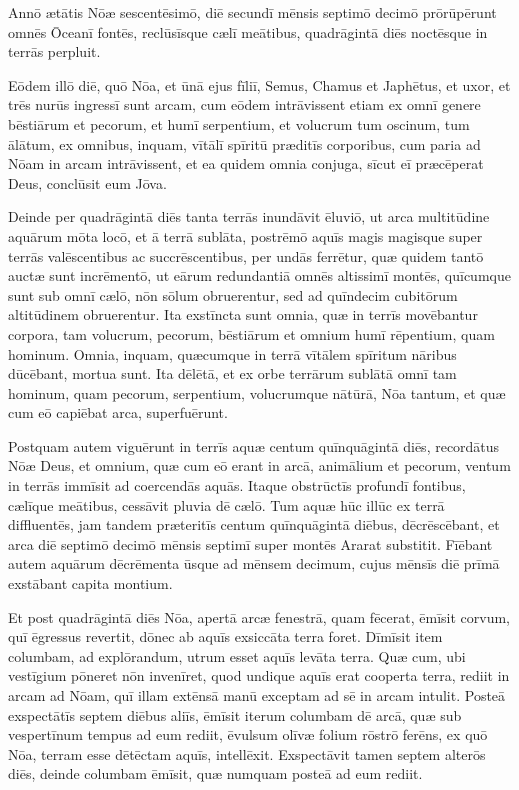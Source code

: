 \Versus Annō ætātis Nōæ sescentēsimō, diē secundī mēnsis septimō decimō prōrūpērunt omnēs Ōceanī fontēs, reclūsīsque cælī meātibus,
\Versus quadrāgintā diēs noctēsque in terrās perpluit.

\Versus Eōdem illō diē, quō Nōa, et ūnā ejus fīliī, Semus, Chamus et Japhētus, et uxor, et trēs nurūs ingressī sunt arcam,
\Versus cum eōdem intrāvissent etiam ex omnī genere bēstiārum et pecorum, et humī serpentium, et volucrum tum oscinum, tum ālātum,
\Versus ex omnibus, inquam, vītālī spīritū præditīs corporibus, cum paria ad Nōam in arcam intrāvissent,
\Versus et ea quidem omnia conjuga, sīcut eī præcēperat Deus, conclūsit eum Jōva.

\Versus Deinde per quadrāgintā diēs tanta terrās inundāvit ēluviō, ut arca multitūdine aquārum mōta locō, et ā terrā sublāta,
\Versus postrēmō aquīs magis magisque super terrās valēscentibus ac succrēscentibus, per undās ferrētur,
\Versus quæ quidem tantō auctæ sunt incrēmentō, ut eārum redundantiā omnēs altissimī montēs, quīcumque sunt sub omnī cælō, nōn sōlum obruerentur,
\Versus sed ad quīndecim cubitōrum altitūdinem obruerentur.
\Versus Ita exstīncta sunt omnia, quæ in terrīs movēbantur corpora, tam volucrum, pecorum, bēstiārum et omnium humī rēpentium, quam hominum.
\Versus Omnia, inquam, quæcumque in terrā vītālem spīritum nāribus dūcēbant, mortua sunt.
\Versus Ita dēlētā, et ex orbe terrārum sublātā omnī tam hominum, quam pecorum, serpentium, volucrumque nātūrā, Nōa tantum, et quæ cum eō capiēbat arca, superfuērunt.



\Caput
\Versus Postquam autem viguērunt in terrīs aquæ centum quīnquāgintā diēs, recordātus Nōæ Deus, et omnium, quæ cum eō erant in arcā, animālium et pecorum, ventum in terrās immīsit ad coercendās aquās.
\Versus Itaque obstrūctīs profundī fontibus, cælīque meātibus, cessāvit pluvia dē cælō.
\Versus Tum aquæ hūc illūc ex terrā diffluentēs, jam tandem præteritīs centum quīnquāgintā diēbus, dēcrēscēbant,
\Versus et arca diē septimō decimō mēnsis septimī super montēs Ararat substitit.
\Versus Fīēbant autem aquārum dēcrēmenta ūsque ad mēnsem decimum, cujus mēnsīs diē prīmā exstābant capita montium.

\Versus Et post quadrāgintā diēs Nōa, apertā arcæ fenestrā, quam fēcerat,
\Versus ēmīsit corvum, quī ēgressus revertit, dōnec ab aquīs exsiccāta terra foret.
\Versus Dīmīsit item columbam, ad explōrandum, utrum esset aquīs levāta terra.
\Versus Quæ cum, ubi vestīgium pōneret nōn invenīret, quod undique aquīs erat cooperta terra, rediit in arcam ad Nōam, quī illam extēnsā manū exceptam ad sē in arcam intulit.
\Versus Posteā exspectātīs septem diēbus aliīs, ēmīsit iterum columbam dē arcā,
\Versus quæ sub vespertīnum tempus ad eum rediit, ēvulsum olīvæ folium rōstrō ferēns, ex quō Nōa, terram esse dētēctam aquīs, intellēxit.
\Versus Exspectāvit tamen septem alterōs diēs, deinde columbam ēmīsit, quæ numquam posteā ad eum rediit.

